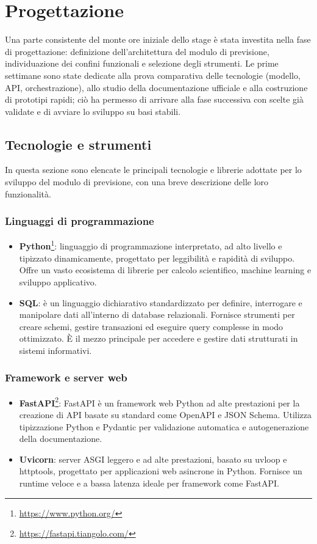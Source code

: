 \chapter{Progettazione}
\label{chap:progettazione}
Una parte consistente del monte ore iniziale dello stage è stata investita nella fase di progettazione: definizione dell’architettura del modulo di previsione, individuazione dei confini funzionali e selezione degli strumenti. Le prime settimane sono state dedicate alla prova comparativa delle tecnologie (modello, API, orchestrazione), allo studio della documentazione ufficiale e alla costruzione di prototipi rapidi; ciò ha permesso di arrivare alla fase successiva con scelte già validate e di avviare lo sviluppo su basi stabili.

\section{Tecnologie e strumenti}
\label{sec:tecnologie-strumenti}
In questa sezione sono elencate le principali tecnologie e librerie adottate per lo sviluppo del modulo di previsione, con una breve descrizione delle loro funzionalità.

\subsection{Linguaggi di programmazione}
\begin{itemize}
    \item \textbf{Python}\footnote{\url{https://www.python.org/}}: linguaggio di programmazione interpretato, ad alto livello e tipizzato dinamicamente, progettato per leggibilità e rapidità di sviluppo. Offre un vasto ecosistema di librerie per calcolo scientifico, machine learning e sviluppo applicativo.
    \item \textbf{SQL}: è un linguaggio dichiarativo standardizzato per definire, interrogare e manipolare dati all’interno di database relazionali. Fornisce strumenti per creare schemi, gestire transazioni ed eseguire query complesse in modo ottimizzato. È il mezzo principale per accedere e gestire dati strutturati in sistemi informativi.
    
\end{itemize}

\subsection{Framework e server web}
\begin{itemize}
    \item \textbf{FastAPI}\footnote{\url{https://fastapi.tiangolo.com/}}: FastAPI è un framework web Python ad alte prestazioni per la creazione di API basate su standard come OpenAPI e JSON Schema. Utilizza tipizzazione Python e Pydantic per validazione automatica e autogenerazione della documentazione.
    \item \textbf{Uvicorn}: server ASGI leggero e ad alte prestazioni, basato su uvloop e httptools, progettato per applicazioni web asincrone in Python. Fornisce un runtime veloce e a bassa latenza ideale per framework come FastAPI.
\end{itemize}

